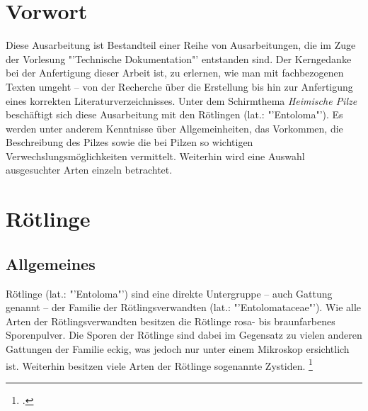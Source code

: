 \documentclass[a4paper,abstracton]{scrreprt}
\begin{document}


\tableofcontents
\listoffigures

\begin{abstract}
\begin{quote}%
Diese Arbeit befasst sich mit der Beschreibung einer Pilzgattung in der Ordnung der Champignonartigen, in der Familie der Rötlingsverwandten. Es handelt sich dabei um die sogenannten \emph{Rötlinge -- lateinisch Entoloma --}.
\end{quote} 
\end{abstract}

\chapter{Vorwort}
Diese Ausarbeitung ist Bestandteil einer Reihe von Ausarbeitungen, die im Zuge der Vorlesung "'Technische Dokumentation"' entstanden sind. Der Kerngedanke bei der Anfertigung dieser Arbeit ist, zu erlernen, wie man mit fachbezogenen Texten umgeht -- von der Recherche über die Erstellung bis hin zur Anfertigung eines korrekten Literaturverzeichnisses. Unter dem Schirmthema \emph{Heimische Pilze} beschäftigt sich diese Ausarbeitung mit den Rötlingen (lat.: "'Entoloma"'). Es werden unter anderem Kenntnisse über Allgemeinheiten, das Vorkommen, die Beschreibung des Pilzes sowie die bei Pilzen so wichtigen Verwechslungsmöglichkeiten vermittelt. Weiterhin wird eine Auswahl ausgesuchter Arten einzeln betrachtet.
\chapter{Rötlinge}
\section{Allgemeines}
Rötlinge (lat.: "'Entoloma"') sind eine direkte Untergruppe -- auch Gattung genannt -- der Familie der Rötlingsverwandten (lat.: "'Entolomataceae"'). Wie alle Arten der Rötlingsverwandten besitzen die Rötlinge rosa- bis braunfarbenes Sporenpulver. Die Sporen der Rötlinge sind dabei im Gegensatz zu vielen anderen Gattungen der Familie eckig, was jedoch nur unter einem Mikroskop ersichtlich ist. Weiterhin besitzen viele Arten der Rötlinge sogenannte Zystiden. \footcite{entoloma}
\end{document}
